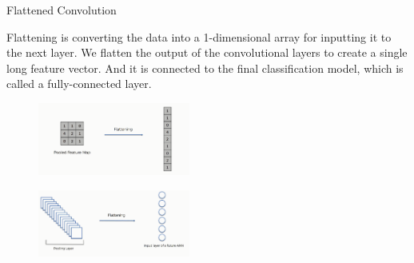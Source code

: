 \begin{vbframe}{Flattened Convolution}
    
Flattening is converting the data into a 1-dimensional array for inputting it to the next layer. We flatten the output of the convolutional layers to create a single long feature vector. And it is connected to the final classification model, which is called a fully-connected layer.
          
\begin{figure}
\centering
\includegraphics[width=5cm]{plots/05_conv_variations/flaten/flat1.png}
\end{figure}
     
\begin{figure}
\centering
\includegraphics[width=5cm]{plots/05_conv_variations/flaten/flat2.png}
\end{figure}

\end{vbframe}



